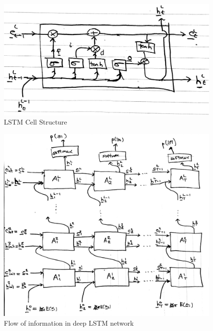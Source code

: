 \documentclass[12pt,a4paper,twoside,openright]{report}
\begin{document}
\begin{figure}[H]
\centering
\includegraphics[width=350pt]{figs/lstm_detail_tmp.png}
\caption{LSTM Cell Structure}
\label{fig:lstm-cell}
\end{figure}

\begin{figure}[H]
\centering
\includegraphics[width=400pt]{figs/lstm_net_tmp.jpg}
\caption{Flow of information in deep LSTM network}
\label{fig:deep-lstm-arch}
\end{figure}
\end{document}
